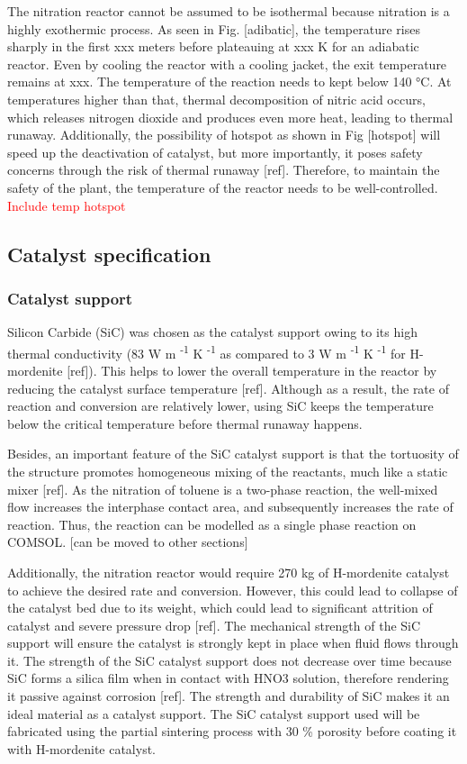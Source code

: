 The nitration reactor cannot be assumed to be isothermal because nitration is a highly exothermic process. As seen in Fig. [adibatic], the temperature rises sharply in the first xxx meters before plateauing at xxx K for an adiabatic reactor. Even by cooling the reactor with a cooling jacket, the exit temperature remains at xxx. The temperature of the reaction needs to kept below 140 °C. At temperatures higher than that, thermal decomposition of nitric acid occurs, which releases nitrogen dioxide and produces even more heat, leading to thermal runaway. Additionally, the possibility of hotspot as shown in Fig [hotspot] will speed up the deactivation of catalyst, but more importantly, it poses safety concerns through the risk of thermal runaway [ref]. Therefore, to maintain the safety of the plant, the temperature of the reactor needs to be well-controlled.
\textcolor{red}{Include temp hotspot}

\subsection{Catalyst specification}
\subsubsection{Catalyst support}
Silicon Carbide (SiC) was chosen as the catalyst support owing to its high thermal conductivity (83 W m \textsuperscript{-1} K \textsuperscript{-1} as compared to 3 W m \textsuperscript{-1} K \textsuperscript{-1} for H-mordenite [ref]). This helps to lower the overall temperature in the reactor by reducing the catalyst surface temperature [ref]. Although as a result, the rate of reaction and conversion are relatively lower, using SiC keeps the temperature below the critical temperature before thermal runaway happens. 

Besides, an important feature of the SiC catalyst support is that the tortuosity of the structure promotes homogeneous mixing of the reactants, much like a static mixer [ref]. As the nitration of toluene is a two-phase reaction, the well-mixed flow increases the interphase contact area, and subsequently increases the rate of reaction. Thus, the reaction can be modelled as a single phase reaction on COMSOL. [can be moved to other sections] 

Additionally, the nitration reactor would require 270 kg of H-mordenite catalyst to achieve the desired rate and conversion. However, this could lead to collapse of the catalyst bed due to its weight, which could lead to significant attrition of catalyst and severe pressure drop [ref]. The mechanical strength of the SiC support will ensure the catalyst is strongly kept in place when fluid flows through it. The strength of the SiC catalyst support does not decrease over time because SiC forms a silica film when in contact with HNO3 solution, therefore rendering it passive against corrosion [ref]. The strength and durability of SiC makes it an ideal material as a catalyst support. The SiC catalyst support used will be fabricated using the partial sintering process with 30 \% porosity before coating it with H-mordenite catalyst.

